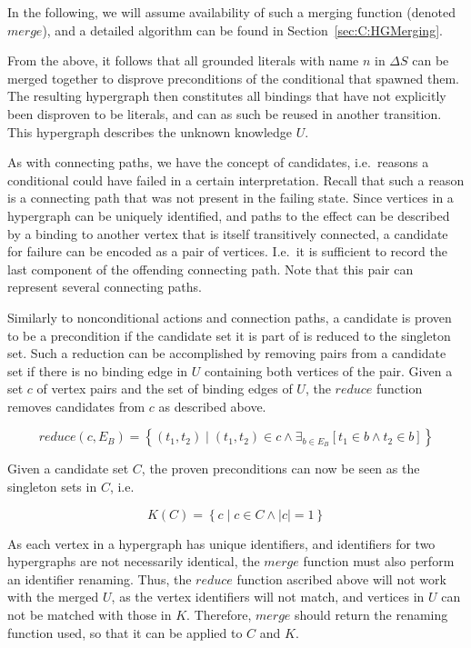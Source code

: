 \documentclass[\master/Master.tex]{subfiles}
\begin{document}
In the following, we will assume availability of such a merging function (denoted $merge$), and a detailed algorithm can be found in Section~\ref{sec:C:HGMerging}.

From the above, it follows that all grounded literals with name $n$ in $\Delta S$ can be merged together to disprove preconditions of the conditional that spawned them. The resulting hypergraph then constitutes all bindings that have not explicitly been disproven to be literals, and can as such be reused in another transition. This hypergraph describes the unknown knowledge $U$.

As with connecting paths, we have the concept of candidates, i.e.\ reasons a conditional could have failed in a certain interpretation. Recall that such a reason is a connecting path that was not present in the failing state. Since vertices in a hypergraph can be uniquely identified, and paths to the effect can be described by a binding to another vertex that is itself transitively connected, a candidate for failure can be encoded as a pair of vertices. I.e.\ it is sufficient to record the last component of the offending connecting path. Note that this pair can represent several connecting paths.

Similarly to nonconditional actions and connection paths, a candidate is proven to be a precondition if the candidate set it is part of is reduced to the singleton set. Such a reduction can be accomplished by removing pairs from a candidate set if there is no binding edge in $U$ containing both vertices of the pair. Given a set $c$ of vertex pairs and the set of binding edges of $U$, the $reduce$ function removes candidates from $c$ as described above.

\begin{equation*}
    reduce(c, E_B) =
    \left\{ \left( t_1, t_2 \right) \mid 
        \left( t_1, t_2 \right) \in c \land 
        \exists_{b \in E_B} \left[ t_1 \in b \land t_2 \in b \right] 
    \right\}
\end{equation*}

Given a candidate set $C$, the proven preconditions can now be seen as the singleton sets in $C$, i.e.\ 

\begin{equation*}
    K(C) = \left\{ 
        c \mid c \in C \land |c| = 1
    \right\}
\end{equation*}

As each vertex in a hypergraph has unique identifiers, and identifiers for two hypergraphs are not necessarily identical, the $merge$ function must also perform an identifier renaming. Thus, the $reduce$ function ascribed above will not work with the merged $U$, as the vertex identifiers will not match, and vertices in $U$ can not be matched with those in $K$. Therefore, $merge$ should return the renaming function used, so that it can be applied to $C$ and $K$.
\end{document}
